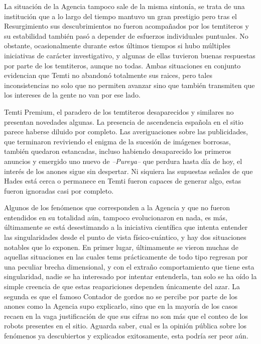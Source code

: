 \documentclass[
  spanish,
]{book}
\begin{document}
La situación de la Agencia tampoco sale de la misma sintonía, se trata de una institución que a lo largo del tiempo mantuvo un gran prestigio pero tras el Resurgimiento sus descubrimientos no fueron acompañados por los temtiteros y su estabilidad también pasó a depender de esfuerzos individuales puntuales. No obstante, ocasionalmente durante estos últimos tiempos si hubo múltiples iniciativas de carácter investigativo, y algunas de ellas tuvieron buenas respuestas por parte de los temtiteros, aunque no todas.
Ambas situaciones en conjunto evidencian que Temti no abandonó totalmente sus raices, pero tales inconsistencias no solo que no permiten avanzar sino que también transmiten que los intereses de la gente no van por ese lado.

Temti Premium, el paradero de los temtiteros desaparecidos y similares no presentan novedades algunas. La presencia de ascendencia española en el sitio parece haberse diluido por completo.
Las averiguaciones sobre las publicidades, que terminaron reviviendo el enigma de la sucesión de imágenes borrosas, también quedaron estancadas, incluso habiendo desaparecido los primeros anuncios y emergido uno nuevo de \emph{--Pureya--} que perdura hasta día de hoy, el interés de los anones sigue sin despertar. Ni siquiera las supuestas señales de que Hades está cerca o permanece en Temti fueron capaces de generar algo, estas fueron ignoradas casi por completo.

Algunos de los fenómenos que corresponden a la Agencia y que no fueron entendidos en su totalidad aún, tampoco evolucionaron en nada, es más, últimamente se está desestimando a la iniciativa científica que intenta entender las singularidades desde el punto de vista físico-cuántico, y hay dos situaciones notables que lo exponen. En primer lugar, últimamente se vieron muchas de aquellas situaciones en las cuales tems prácticamente de todo tipo regresan por una peculiar brecha dimensional, y con el extraño comportamiento que tiene esta singularidad, nadie se ha interesado por intentar entenderla, tan solo se ha oído la simple creencia de que estas reapariciones dependen únicamente del azar. La segunda es que el famoso Contador de gordos no se percibe por parte de los anones como la Agencia supo explicarlo, sino que en la mayoría de los casos recaen en la vaga justificación de que sus cifras no son más que el conteo de los robots presentes en el sitio. Aguarda saber, cual es la opinión pública sobre los fenómenos ya descubiertos y explicados exitosamente, esta podría ser peor aún.
\end{document}
